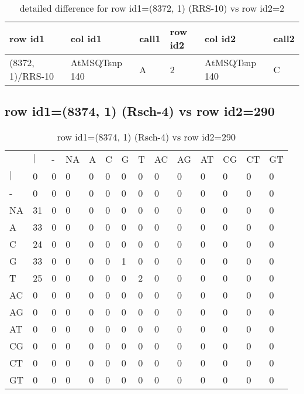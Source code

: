 \begin{center}
\begin{longtable}{|l|l|l|l|l|l|}
\caption{detailed difference for row id1=(8372, 1) (RRS-10) vs row id2=2} \label{table_dm609}\\
\hline
row id1&col id1&call1&row id2&col id2&call2\\
\hline
(8372, 1)/RRS-10&AtMSQTsnp 140&A&2&AtMSQTsnp 140&C\\
\hline
\end{longtable}
\end{center}

\subsection{row id1=(8374, 1) (Rsch-4) vs row id2=290}
\begin{center}
\begin{longtable}{|l|l|l|l|l|l|l|l|l|l|l|l|l|l|}
\caption{row id1=(8374, 1) (Rsch-4) vs row id2=290} \label{table_dm610}\\
\hline
\\
\hline
&$|$&-&NA&A&C&G&T&AC&AG&AT&CG&CT&GT\\
$|$&0&0&0&0&0&0&0&0&0&0&0&0&0\\
-&0&0&0&0&0&0&0&0&0&0&0&0&0\\
NA&31&0&0&0&0&0&0&0&0&0&0&0&0\\
A&33&0&0&0&0&0&0&0&0&0&0&0&0\\
C&24&0&0&0&0&0&0&0&0&0&0&0&0\\
G&33&0&0&0&0&1&0&0&0&0&0&0&0\\
T&25&0&0&0&0&0&2&0&0&0&0&0&0\\
AC&0&0&0&0&0&0&0&0&0&0&0&0&0\\
AG&0&0&0&0&0&0&0&0&0&0&0&0&0\\
AT&0&0&0&0&0&0&0&0&0&0&0&0&0\\
CG&0&0&0&0&0&0&0&0&0&0&0&0&0\\
CT&0&0&0&0&0&0&0&0&0&0&0&0&0\\
GT&0&0&0&0&0&0&0&0&0&0&0&0&0\\
\hline
\end{longtable}
\end{center}

